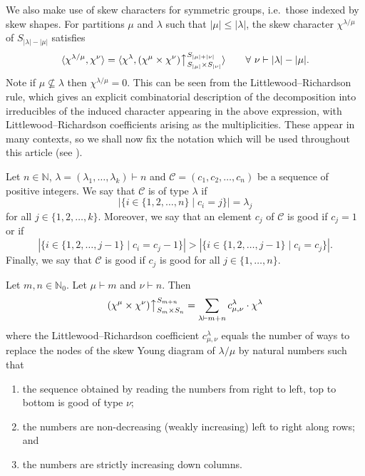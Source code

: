 \documentclass[ALCO, Unicode]{cedram}
\newcommand{\up}{\big\uparrow}
\newcommand{\N}{\mathbb{N}}
\begin{document}
We also make use of skew characters for symmetric groups, i.e.~those indexed by skew shapes. For partitions $\mu$ and $\lambda$ such that $|\mu|\le|\lambda|$, the skew character $\chi^{\lambda/\mu}$ of $S_{|\lambda|-|\mu|}$ satisfies
\begin{equation}\label{eqn:skew}
	\langle \chi^{\lambda/\mu},\chi^\nu\rangle = \langle \chi^\lambda, (\chi^\mu\times \chi^\nu)\up_{S_{|\mu|}\times S_{|\nu|}}^{S_{|\mu|+|\nu|}}\rangle\qquad\forall\ \nu\vdash |\lambda|-|\mu|.
\end{equation}
Note if $\mu\not\subseteq\lambda$ then $\chi^{\lambda/\mu}=0$. This can be seen from the Littlewood--Richardson rule, which gives an explicit combinatorial description of the decomposition into irreducibles of the induced character appearing in the above expression, with Littlewood--Richardson coefficients arising as the multiplicities. These appear in many contexts, so we shall now fix the notation which will be used throughout this article (see \cite{J}).

\begin{definition}
	Let $n\in\N$, $\lambda=(\lambda_1,\dotsc,\lambda_k)\vdash n$ and $\mathcal{C}=(c_1,c_2,\dotsc,c_n)$ be a sequence of positive integers. We say that $\mathcal{C}$ is of type $\lambda$ if 
	\[ |\{i\in\{1,2,\dotsc,n\} \mid c_i=j\}|=\lambda_j\]
	for all $j\in\{1,2,\dotsc,k\}$. Moreover, we say that an element $c_j$ of $\mathcal{C}$ is good if $c_j=1$ or if
	\[ |\{i\in\{1,2,\dotsc,j-1\}\mid c_i=c_j-1\}| > |\{i\in\{1,2,\dotsc,j-1\}\mid c_i=c_j\}|. \]
	Finally, we say that $\mathcal{C}$ is good if $c_j$ is good for all $j\in\{1,\dotsc,n\}$.
\end{definition}

\begin{theorem}\label{thm:LR}
	Let $m,n\in\mathbb{N}_0$. Let $\mu\vdash m$ and $\nu\vdash n$. Then
	\[ (\chi^\mu\times\chi^\nu)\up^{S_{m+n}}_{S_m\times S_n} = \sum_{\lambda\vdash m+n} c^\lambda_{\mu,\nu}\cdot \chi^\lambda\]
	where the Littlewood--Richardson coefficient $c^\lambda_{\mu,\nu}$ equals the number of ways to replace the nodes of the skew Young diagram of $\lambda/\mu$ by natural numbers such that
	\begin{enumerate}[label=(\roman*)]
		\item\label{it1} the sequence obtained by reading the numbers from right to left, top to bottom is good of type $\nu$;
		\item \label{it2} the numbers are non-decreasing \textup{(}weakly increasing\textup{)} left to right along rows; and
		\item \label{it3} the numbers are strictly increasing down columns.
	\end{enumerate}
\end{theorem}
\end{document}

